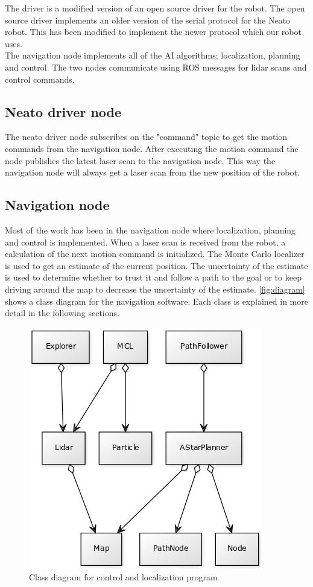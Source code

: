 The driver is a modified version of an open source driver for the robot.  The open source driver implements an older version of the serial protocol for the Neato robot. This has been modified to implement the newer protocol which our robot uses.\\

The navigation node implements all of the AI algorithms; localization, planning and control. The two nodes communicate using ROS messages for lidar scans and control commands. 

\subsection{Neato driver node}
The neato driver node subscribes on the "command" topic to get the motion commands from the navigation node. After executing the motion command the node publishes the latest laser scan to the navigation node. This way the navigation node will always get a laser scan from the new position of the robot.

\subsection{Navigation node}
Most of the work has been in the navigation node where localization, planning and control is implemented. When a laser scan is received from the robot, a calculation of the next motion command is initialized. The Monte Carlo localizer is used to get an estimate of the current position. The uncertainty of the estimate is used to determine whether to trust it and follow a path to the goal or to keep driving around the map to decrease the uncertainty of the estimate. \autoref{fig:diagram} shows a class diagram for the navigation software. Each class is explained in more detail in the following sections.

\begin{figure}[H]
\centering
\includegraphics[scale=0.40]{images/diagram}
\caption{Class diagram for control and localization program}
\label{fig:diagram}
\end{figure}

